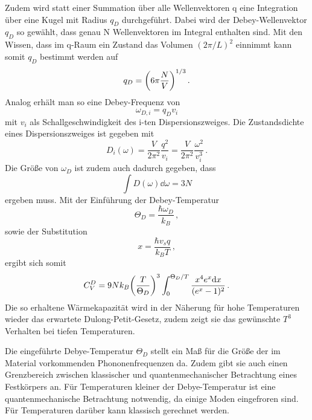 Zudem wird statt einer Summation über alle Wellenvektoren q eine Integration über eine Kugel mit Radius $q_D$ durchgeführt. Dabei wird der Debey-Wellenvektor $q_D$ so gewählt, dass genau N Wellenvektoren im Integral enthalten sind.
Mit den Wissen, dass im q-Raum  ein Zustand das Volumen $(2\pi/L)^2$ einnimmt kann somit $q_D$ bestimmt werden auf
\begin{equation}
	q_D = \qty(6\pi \frac{N}{V})^{1/3} \,.
	\label{eq:D-q}
\end{equation}
Analog erhält man so eine Debey-Frequenz von
\begin{equation}
	\omega_{D,i} = q_D v_i
	\label{eq:D-Freg}
\end{equation}
mit $v_i$ als Schallgeschwindigkeit des i-ten Dispersionszweiges. 
Die Zustandsdichte eines Dispersionszweiges ist gegeben mit
\begin{equation}
	D_i(\omega)= \frac{V}{2\pi^2}\frac{q^2}{v_i} =   \frac{V}{2\pi^2}\frac{\omega^2}{v_i^3} \,.
	\label{eqn:Z}
\end{equation}
Die Größe von $\omega_D$ ist zudem auch dadurch gegeben, dass
\begin{equation}
	\int D(\omega) \dd\omega = 3 N
	\label{eq:}
\end{equation}
ergeben muss.
Mit der Einführung der Debey-Temperatur
\begin{equation}
	\Theta_D = \frac{\hbar\omega_D}{k_B} \,,
	\label{eq:D-Temp}
\end{equation}
sowie der Substitution
\begin{equation}
	x=\frac{\hbar v_s q}{k_B T} \,,
\end{equation}
ergibt sich somit 
\begin{equation}
	\label{eqn:udebye}
	C_V^D = 9Nk_B \qty(\frac{T}{\Theta_D})^3 \int_0^{\Theta_D/T} \frac{x^4e^x \dd x}{(e^x-1)^2} \,.
\end{equation}
Die so erhaltene Wärmekapazität wird in der Näherung für hohe Temperaturen wieder das erwartete Dulong-Petit-Gesetz, zudem zeigt sie das gewünschte $T^3$ Verhalten bei tiefen Temperaturen.

Die eingeführte Debye-Temperatur $\Theta_D$ stellt ein Maß für die Größe der im Material vorkommenden Phononenfrequenzen da. Zudem gibt sie auch einen Grenzbereich zwischen klassischer und quantenmechanischer Betrachtung eines Festkörpers an. Für Temperaturen kleiner der Debye-Temperatur ist eine quantenmechanische Betrachtung notwendig, da einige Moden eingefroren sind. Für Temperaturen darüber kann klassisch gerechnet werden.